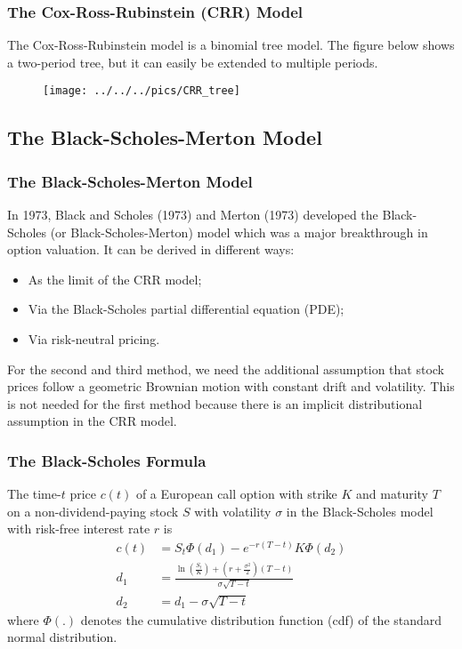 \begin{frame}[fragile]
\frametitle{The Cox-Ross-Rubinstein (CRR) Model}
The Cox-Ross-Rubinstein model is a binomial tree model. The figure below shows a
two-period tree, but it can easily be extended to multiple periods.
\begin{figure}[htp]
\begin{center}
\texttt{[image: ../../../pics/CRR\_tree]}
\end{center}
\end{figure}
\end{frame}


\subsection{The Black-Scholes-Merton Model}
\begin{frame}[fragile]
\frametitle{The Black-Scholes-Merton Model}
In 1973, Black and Scholes (1973) and Merton (1973)
developed the Black-Scholes (or Black-Scholes-Merton) model which was a major breakthrough in
option valuation. It can be derived in different ways:
\begin{itemize}
  \item As the limit of the CRR model;
  \item Via the Black-Scholes partial differential equation (PDE);
  \item Via risk-neutral pricing.
\end{itemize}
For the second and third method, we need the additional assumption that stock
prices follow a geometric Brownian motion with constant drift and volatility.
This is not needed for the first method because there is an implicit distributional assumption in the CRR model.
\end{frame}

\begin{frame}[fragile]
\frametitle{The Black-Scholes Formula}
The time-$t$ price $c(t)$ of a European call option with strike $K$ and
maturity $T$ on a non-dividend-paying stock $S$ with volatility $\sigma$ in the
Black-Scholes model with risk-free interest rate $r$ is
\begin{align*}
  c(t) &= S_t \Phi(d_1) - e^{-r(T-t)}K\Phi(d_2)\\
  d_1 &= \frac{\ln \left(\frac{S_t}{K} \right) +
  \left(r+\frac{\sigma^2}{2}\right)(T-t)}{\sigma\sqrt{T-t}}\\
  d_2 &= d_1 - \sigma \sqrt{T-t}
\end{align*}
where $\Phi(.)$ denotes the cumulative distribution function (cdf) of the standard
normal distribution.
\end{frame}


